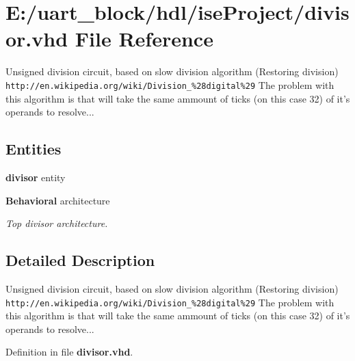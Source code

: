 \section{E\-:/uart\-\_\-block/hdl/ise\-Project/divisor.vhd File Reference}
\label{divisor_8vhd}


Unsigned division circuit, based on slow division algorithm (Restoring division) {\tt http\-://en.\-wikipedia.\-org/wiki/\-Division\-\_\-\%28digital\%29} The problem with this algorithm is that will take the same ammount of ticks (on this case 32) of it's operands to resolve...  


\subsection*{Entities}
\begin{DoxyCompactItemize}
\item 
{\bf divisor} entity
\item 
{\bf Behavioral} architecture
\begin{DoxyCompactList}\small\item\em Top divisor architecture. \end{DoxyCompactList}\end{DoxyCompactItemize}


\subsection{Detailed Description}
Unsigned division circuit, based on slow division algorithm (Restoring division) {\tt http\-://en.\-wikipedia.\-org/wiki/\-Division\-\_\-\%28digital\%29} The problem with this algorithm is that will take the same ammount of ticks (on this case 32) of it's operands to resolve... 

Definition in file {\bf divisor.\-vhd}.

